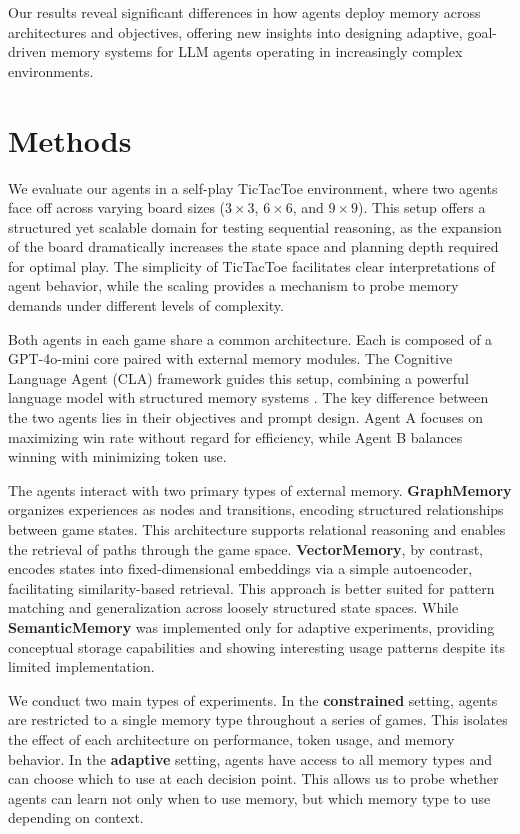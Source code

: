 \documentclass[10pt]{article}
\begin{document}
Our results reveal significant differences in how agents deploy memory across architectures and objectives, offering new insights into designing adaptive, goal-driven memory systems for LLM agents operating in increasingly complex environments.

\section{Methods}

We evaluate our agents in a self-play TicTacToe environment, where two agents face off across varying board sizes ($3 \times 3$, $6 \times 6$, and $9 \times 9$). This setup offers a structured yet scalable domain for testing sequential reasoning, as the expansion of the board dramatically increases the state space and planning depth required for optimal play. The simplicity of TicTacToe facilitates clear interpretations of agent behavior, while the scaling provides a mechanism to probe memory demands under different levels of complexity.

Both agents in each game share a common architecture. Each is composed of a GPT-4o-mini core paired with external memory modules. The Cognitive Language Agent (CLA) framework guides this setup, combining a powerful language model with structured memory systems \cite{sumers2024cognitivearchitectureslanguageagents}. The key difference between the two agents lies in their objectives and prompt design. Agent A focuses on maximizing win rate without regard for efficiency, while Agent B balances winning with minimizing token use.

The agents interact with two primary types of external memory. \textbf{GraphMemory} organizes experiences as nodes and transitions, encoding structured relationships between game states. This architecture supports relational reasoning and enables the retrieval of paths through the game space. \textbf{VectorMemory}, by contrast, encodes states into fixed-dimensional embeddings via a simple autoencoder, facilitating similarity-based retrieval. This approach is better suited for pattern matching and generalization across loosely structured state spaces. While \textbf{SemanticMemory} was implemented only for adaptive experiments, providing conceptual storage capabilities and showing interesting usage patterns despite its limited implementation.

We conduct two main types of experiments. In the \textbf{constrained} setting, agents are restricted to a single memory type throughout a series of games. This isolates the effect of each architecture on performance, token usage, and memory behavior. In the \textbf{adaptive} setting, agents have access to all memory types and can choose which to use at each decision point. This allows us to probe whether agents can learn not only when to use memory, but which memory type to use depending on context.
\end{document}
